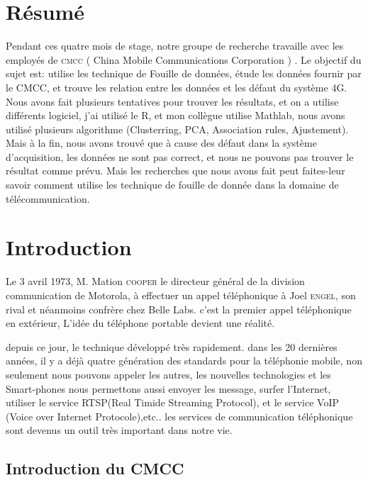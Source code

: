 
\section{Résumé} 

Pendant ces quatre mois de stage, notre groupe de recherche travaille avec les employés de \textsc{cmcc} ( China Mobile Communications Corporation ) . Le objectif du sujet est: utilise les technique de Fouille de données, étude les données fournir par le CMCC, et trouve les relation entre les données et les défaut du système 4G. Nous avons fait plusieurs tentatives pour trouver les résultats, et on a utilise différents logiciel, j'ai utilisé le R, et mon collègue utilise Mathlab, nous avons utilisé plusieurs algorithme (Clusterring, PCA, Association rules, Ajustement). Mais à la fin,  nous avons trouvé que à cause des défaut dans la système d'acquisition, les données ne sont pas correct, et nous ne pouvons pas trouver le résultat comme prévu. Mais les recherches que nous avons fait peut faites-leur savoir comment utilise les technique de fouille de donnée dans la domaine de télécommunication.

\section{Introduction} 
 
Le 3 avril 1973, M. Mation \textsc{cooper} le directeur général de la division communication de Motorola, à effectuer un appel téléphonique à Joel \textsc{engel}, son rival et néanmoins confrère chez \textsf{Belle Labs}. c'est la premier appel téléphonique en extérieur, L'idée du téléphone portable devient une réalité. 

depuis ce jour, le technique développé très rapidement. dans les 20 dernières années, il y a déjà quatre génération des standards pour la téléphonie mobile, non seulement nous pouvons appeler les autres, les nouvelles technologies et les Smart-phones nous permettons aussi envoyer les message, surfer l'Internet, utiliser le service RTSP(Real Timide Streaming Protocol), et le service VoIP (Voice over Internet Protocole),etc.. les services de communication téléphonique sont devenus un outil très important dans notre vie.
 
 \subsection{Introduction du CMCC}
 
